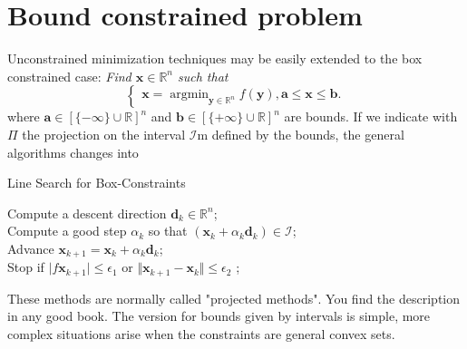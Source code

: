 \documentclass{article}
\begin{document}
 \section{Bound constrained problem}
 Unconstrained minimization techniques may be easily extended to the box constrained case: 
 \emph{Find $\mathbf{x}\in \mathbb{R}^n$ such that}
 \[
 \begin{cases}
 \mathbf{x}=\operatorname{argmin}_{\mathbf{y}\in\mathbb{R}^n} f(\mathbf{y}),
 \mathbf{a}\le \mathbf{x}\le \mathbf{b}.
 \end{cases}
 \]
 where $\mathbf{a}\in [\{-\infty\}\cup\mathbb{R}]^n$  and $\mathbf{b}\in [\{+\infty\}\cup\mathbb{R}]^n$ are bounds.
 If we indicate with $\Pi$ the projection on the interval $\mathcal{I}$m defined by the bounds, the general algorithms changes into 
 \begin{algorithm}
     \caption{Line Search for Box-Constraints}
     Compute a descent direction $\mathbf{d}_k\in\mathbb{R}^n$;\\
     Compute a good step $\alpha_k$ so that $(\mathbf{x}_k+\alpha_k\mathbf{d}_k)\in\mathcal{I}$;\\
     Advance $\mathbf{x}_{k+1}=\mathbf{x}_k+\alpha_k\mathbf{d}_k$;\\
     Stop if $\vert f\mathbf{x}_{k+1}\vert\le\epsilon_1$ or $\Vert \mathbf{x}_{k+1}-\mathbf{x}_k\Vert\le\epsilon_2$ ;\\
 \end{algorithm}

These methods are normally called "projected methods". You find the description in any good book. The version for bounds given by intervals is simple, more  complex situations arise when the constraints are general convex sets.
\end{document}
